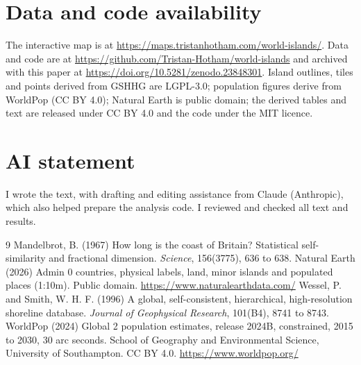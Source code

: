 \documentclass[11pt,a4paper]{article}
\begin{document}
\section*{Data and code availability}
The interactive map is at \url{https://maps.tristanhotham.com/world-islands/}. Data and code are at \url{https://github.com/Tristan-Hotham/world-islands} and archived with this paper at \url{https://doi.org/10.5281/zenodo.23848301}. Island outlines, tiles and points derived from GSHHG are LGPL-3.0; population figures derive from WorldPop (CC BY 4.0); Natural Earth is public domain; the derived tables and text are released under CC BY 4.0 and the code under the MIT licence.

\section*{AI statement}
I wrote the text, with drafting and editing assistance from Claude (Anthropic), which also helped prepare the analysis code. I reviewed and checked all text and results.

\begin{thebibliography}{9}
 Mandelbrot, B. (1967) How long is the coast of Britain? Statistical self-similarity and fractional dimension. \emph{Science}, 156(3775), 636 to 638.
 Natural Earth (2026) Admin 0 countries, physical labels, land, minor islands and populated places (1:10m). Public domain. \url{https://www.naturalearthdata.com/}
 Wessel, P. and Smith, W. H. F. (1996) A global, self-consistent, hierarchical, high-resolution shoreline database. \emph{Journal of Geophysical Research}, 101(B4), 8741 to 8743.
 WorldPop (2024) Global 2 population estimates, release 2024B, constrained, 2015 to 2030, 30 arc seconds. School of Geography and Environmental Science, University of Southampton. CC BY 4.0. \url{https://www.worldpop.org/}
\end{thebibliography}
\end{document}
